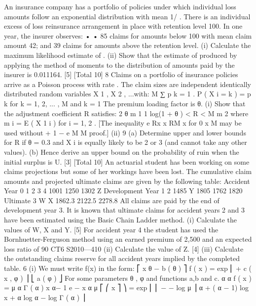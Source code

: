 \documentclass[a4paper,12pt]{article}
\begin{document}
An insurance company has a portfolio of policies under which individual loss amounts follow an exponential distribution with mean 1/ \lambda  . There is an individual excess of loss reinsurance arrangement in place with retention level 100. In one year,
the insurer observes:
•
•
85 claims for amounts below 100 with mean claim amount 42; and
39 claims for amounts above the retention level.
(i) Calculate the maximum likelihood estimate of \lambda  .
(ii) Show that the estimate of \lambda  produced by applying the method of moments to
the distribution of amounts paid by the insurer is 0.011164.
[5]
[Total 10]
8
Claims on a portfolio of insurance policies arrive as a Poisson process with rate \lambda  .
The claim sizes are independent identically distributed random variables
X 1 , X 2 , ...with:
M
∑ p k = 1 .
P ( X i = k ) = p k for k = 1, 2, ... , M and
k = 1
The premium loading factor is θ.
(i)
Show that the adjustment coefficient R satisfies:
2 θ m 1
1
log(1 + θ ) < R <
M
m 2
where m i = E ( X 1 i ) for i = 1, 2 .
[The inequality e Rx \leq 
[7]
x RM
x
for 0 \leq  x \leq  M may be used without
+ 1 −
e
M
M
proof.]
(ii)
9
(a) Determine upper and lower bounds for R if θ = 0.3 and X i is equally likely to be 2 or 3 (and cannot take any other values).
(b) Hence derive an upper bound on the probability of ruin when the initial
surplus is U.
[3]
[Total 10]
An actuarial student has been working on some claims projections but some of her workings have been lost. The cumulative claim amounts and projected ultimate
claims are given by the following table:
Accident
Year 0
1
2
3
4 1001
1250
1302
Z
Development Year
1
2
1485
Y
1805
1762
1820
Ultimate
3
W
X
1862.3
2122.5
2278.8
All claims are paid by the end of development year 3.
It is known that ultimate claims for accident years 2 and 3 have been estimated using the Basic Chain Ladder method.
(i)
Calculate the values of W, X and Y.
[5]
For accident year 4 the student has used the Bornhuetter-Ferguson method using an earned premium of 2,500 and an expected loss ratio of 90%
CT6 S2010—410
(ii) Calculate the value of Z.
[4]
(iii) Calculate the outstanding claims reserve for all accident years implied by the completed table.
6
(i)
We must write f(x) in the form:
⎡ x θ − b ( θ )
⎤
f ( x ) = exp ⎢
+ c ( x , φ ) ⎥
⎣ a ( φ )
⎦
For some parameters θ , φ and functions a,b and c.
α α
f ( x ) =
μ α Γ ( α )
x
α− 1
e
−
x α
μ
⎡ ⎛ x
⎤
⎞
= exp ⎢ ⎜ − − log μ ⎟ α + ( α − 1) log x + α log α − log Γ ( α ) ⎥
\end{document}
